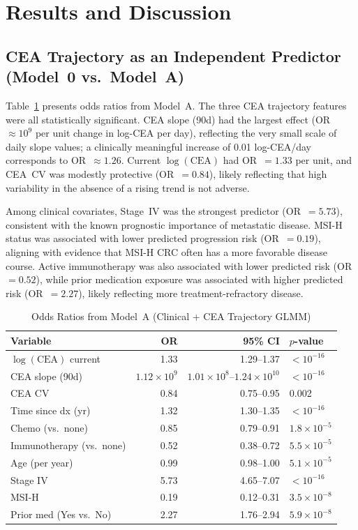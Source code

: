 \documentclass[11pt]{article}
\begin{document}
\section{Results and Discussion}

\subsection*{CEA Trajectory as an Independent Predictor (Model~0 vs.\ Model~A)}

Table~\ref{tab:or} presents odds ratios from Model~A. The three CEA trajectory features were all statistically significant. CEA slope (90d) had the largest effect (OR $\approx 10^9$ per unit change in log-CEA per day), reflecting the very small scale of daily slope values; a clinically meaningful increase of 0.01 log-CEA/day corresponds to OR~$\approx 1.26$. Current $\log(\text{CEA})$ had OR~$= 1.33$ per unit, and CEA~CV was modestly protective (OR~$= 0.84$), likely reflecting that high variability in the absence of a rising trend is not adverse.

Among clinical covariates, Stage~IV was the strongest predictor (OR~$= 5.73$), consistent with the known prognostic importance of metastatic disease. MSI-H status was associated with lower predicted progression risk (OR~$= 0.19$), aligning with evidence that MSI-H CRC often has a more favorable disease course. Active immunotherapy was also associated with lower predicted risk (OR~$= 0.52$), while prior medication exposure was associated with higher predicted risk (OR~$= 2.27$), likely reflecting more treatment-refractory disease.

\begin{table}[H]
\centering
\caption{Odds Ratios from Model~A (Clinical + CEA Trajectory GLMM)}
\label{tab:or}
\small
\begin{tabular}{lrrl}
\toprule
Variable & OR & 95\% CI & $p$-value \\
\midrule
$\log(\text{CEA})$ current & 1.33 & 1.29--1.37 & $< 10^{-16}$ \\
CEA slope (90d) & $1.12 \times 10^9$ & $1.01 \times 10^8$--$1.24 \times 10^{10}$ & $< 10^{-16}$ \\
CEA CV & 0.84 & 0.75--0.95 & 0.002 \\
Time since dx (yr) & 1.32 & 1.30--1.35 & $< 10^{-16}$ \\
Chemo (vs.\ none) & 0.85 & 0.79--0.91 & $1.8 \times 10^{-5}$ \\
Immunotherapy (vs.\ none) & 0.52 & 0.38--0.72 & $5.5 \times 10^{-5}$ \\
Age (per year) & 0.99 & 0.98--1.00 & $5.1 \times 10^{-5}$ \\
Stage IV & 5.73 & 4.65--7.07 & $< 10^{-16}$ \\
MSI-H & 0.19 & 0.12--0.31 & $3.5 \times 10^{-8}$ \\
Prior med (Yes vs.\ No) & 2.27 & 1.76--2.94 & $5.9 \times 10^{-8}$ \\
\bottomrule
\end{tabular}
\end{table}
\end{document}
